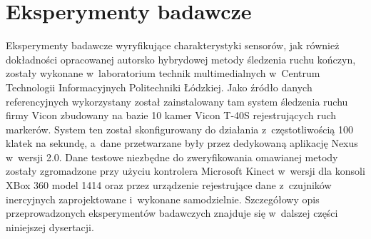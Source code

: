 \chapter{Eksperymenty badawcze}\label{chap:experiments}
Eksperymenty badawcze wyryfikujące charakterystyki sensorów, jak również dokładności opracowanej autorsko hybrydowej metody śledzenia ruchu kończyn, zostały wykonane w~laboratorium technik multimedialnych w~Centrum Technologii Informacyjnych Politechniki Łódzkiej. Jako źródło danych referencyjnych wykorzystany został zainstalowany tam system śledzenia ruchu firmy Vicon zbudowany na bazie 10 kamer Vicon T-40S \cite{ViconSpec} rejestrujących ruch markerów. System ten został skonfigurowany do działania z~częstotliwością 100 klatek na sekundę, a~dane przetwarzane były przez dedykowaną aplikację Nexus w~wersji 2.0. Dane testowe niezbędne do zweryfikowania omawianej metody zostały zgromadzone przy użyciu kontrolera Microsoft Kinect w~wersji dla konsoli XBox 360 model 1414 oraz przez urządzenie rejestrujące dane z~czujników inercyjnych zaprojektowane i~wykonane samodzielnie. Szczegółowy opis przeprowadzonych eksperymentów badawczych znajduje się w~dalszej części niniejszej dysertacji.

